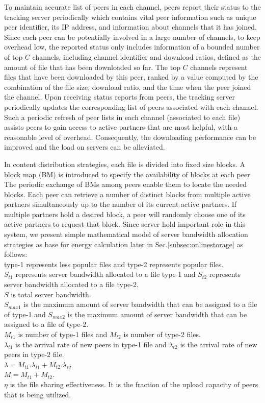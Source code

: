 \documentclass[conference]{IEEEtran}
\begin{document}
To maintain accurate list of peers in each channel, peers report their status to the tracking server periodically which contains vital peer information such as unique peer identifier, its IP address, and information about channels that it has joined. 
Since each peer can be potentially involved in a large number of channels, to keep overhead low, the reported status only includes information of a bounded number of top $C$ channels, including channel identifier and download ratios, defined as the amount of file that has been downloaded so far. 
The top $C$ channels represent files that have been downloaded by this peer, ranked by a value computed by the combination of the file size, download ratio, and the time when the peer joined the channel. 
Upon receiving status reports from peers, the tracking server periodically updates the corresponding list of peers associated with each channel.
Such a periodic refresh of peer lists in each channel (associated to each file) assists peers to gain access to active partners that are most helpful, with a reasonable level of overhead. 
Consequently, the downloading performance can be improved and the load on servers can be alleviated. 

In content distribution strategies, each file is divided into fixed size blocks.
A block map (BM) is introduced to specify the availability of blocks at each peer. 
The periodic exchange of BMs among peers enable them to locate the needed blocks. 
Each peer can retrieve a number of distinct blocks from multiple active partners simultaneously up to the number of its current active partners.
If multiple partners hold a desired block, a peer will randomly choose one of its active partners to request that block.
Since server hold important role in this system, we present simple mathematical model of server bandwidth allocation strategies \cite{4024139,Sun:2009:POS:1542245.1542249} as base for energy calculation later in Sec.\ref{subsec:onlinestorage} as follows:\\
type-1 represents less popular files and type-2 represents popular files. \\
$S_{t1}$ represents server bandwidth allocated to a file type-1 and $S_{t2}$ represents server bandwidth allocated to a file type-2. \\
$S$ is total server bandwidth. \\
$S_{max1}$ is the maximum amount of server bandwidth that can be assigned to a file of type-1 and $S_{max2}$ is the maximum amount of server bandwidth that can be assigned to a file of type-2.\\
$M_{t1}$ is number of type-1 files and  $M_{t2}$ is number of type-2 files.\\
$\lambda_{t1}$ is the arrival rate of new peers in type-1 file and $\lambda_{t2}$ is the arrival rate of new peers in type-2 file.\\
$\lambda = M_{t1}.\lambda_{t1} + M_{t2}.\lambda_{t2}$\\
$M=M_{t1} + M_{t2}$.\\
$\eta$ is the file sharing effectiveness. It is the fraction of the upload capacity of peers that is being utilized.\\
\end{document}
